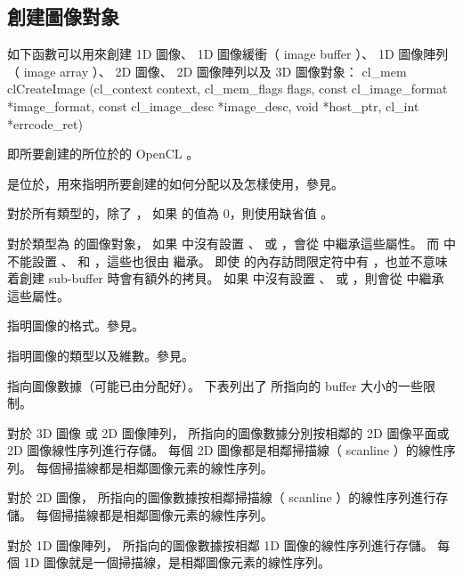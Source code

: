 \subsection{創建圖像對象}
如下函數可以用來創建 1D 圖像、 1D 圖像緩衝（ image buffer ）、 1D 圖像陣列（ image array ）、
2D 圖像、 2D 圖像陣列以及 3D 圖像對象：
\startclc
cl_mem clCreateImage (cl_context context,
		cl_mem_flags flags,
		const cl_image_format *image_format,
		const cl_image_desc *image_desc,
		void *host_ptr,
		cl_int *errcode_ret)
\stopclc

 即所要創建的所位於的 OpenCL 。

 是位於，用來指明所要創建的如何分配以及怎樣使用，參見。

對於所有類型的，除了 ，
如果  的值為 0，則使用缺省值 。

對於類型為  的圖像對象，
如果  中沒有設置 、  或 ，會從  中繼承這些屬性。
而  中不能設置 、  和 ，這些也很由  繼承。
即使  的內存訪問限定符中有 ，也並不意味着創建 sub-buffer 時會有額外的拷貝。
如果  中沒有設置 、  或 ，則會從  中繼承這些屬性。

 指明圖像的格式。參見。

 指明圖像的類型以及維數。參見。

 指向圖像數據（可能已由分配好）。
下表列出了  所指向的 buffer 大小的一些限制。



對於 3D 圖像 或 2D 圖像陣列，  所指向的圖像數據分別按相鄰的 2D 圖像平面或 2D 圖像線性序列進行存儲。
每個 2D 圖像都是相鄰掃描線（ scanline ）的線性序列。
每個掃描線都是相鄰圖像元素的線性序列。

對於 2D 圖像，  所指向的圖像數據按相鄰掃描線（ scanline ）的線性序列進行存儲。
每個掃描線都是相鄰圖像元素的線性序列。

對於 1D 圖像陣列，  所指向的圖像數據按相鄰 1D 圖像的線性序列進行存儲。
每個 1D 圖像就是一個掃描線，是相鄰圖像元素的線性序列。

